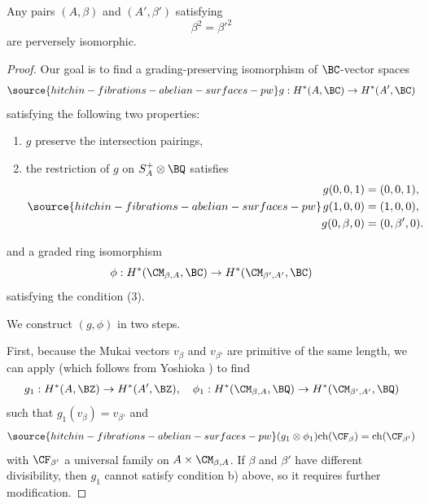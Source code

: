 \begin{thm}
\notready\label{thm2.6}
Any pairs $(A, \beta)$ and $(A', \beta')$ satisfying
\[
\beta^2 = \beta'^2
\]
are perversely isomorphic.
\end{thm}

\begin{proof}

Our goal is to find a grading-preserving isomorphism of $\BC$-vector spaces
\begin{equation}\label{39}
\source{hitchin-fibrations-abelian-surfaces-pw}
g: H^*(A, \BC)  \to H^*(A', \BC)
\end{equation}
satisfying the following two properties:
\begin{enumerate}
    \item[(a)] $g$ preserve the intersection pairings,
    \item[(b)] the restriction of $g$ on $S_A^+\otimes \BQ$ satisfies
    \begin{equation}\label{40}
\source{hitchin-fibrations-abelian-surfaces-pw}
    \begin{split}
        g(0,0,1) & = (0,0,1),\\
        g(1,0,0) & = (1,0,0),\\
        g(0,\beta,0) & = (0, \beta',0).
    \end{split}
    \end{equation}
\end{enumerate}
and a graded ring isomorphism
 \[
 \phi : H^*(\CM_{\beta,A}, \BC) \to H^*(\CM_{\beta', A'}, \BC)
 \]
satisfying the condition (3).

We construct $(g, \phi)$ in two steps.

First, because the Mukai vectors $v_\beta$ and $v_{\beta'}$ are primitive of the same length,
we can apply \cite[Theorem 8.3]{Markman3} (which follows from Yoshioka \cite{Yo}) to find
\[ g_1: H^*(A, \BZ)  \to H^*(A', \BZ) ,\quad \phi_1: H^*(\CM_{\beta,A}, \BQ) \to H^*(\CM_{\beta', A'}, \BQ)\]
such that $g_1(v_\beta) = v_{\beta'}$ and
\begin{equation}\label{eq41}
\source{hitchin-fibrations-abelian-surfaces-pw}
(g_1 \otimes \phi_1) \mathrm{ch}(\CF_\beta) = \mathrm{ch}(\CF_{\beta'})
\end{equation}
with $\CF_{\beta'}$ a universal family on $A \times \CM_{\beta,A}$.
If $\beta$ and $\beta'$ have different divisibility, then $g_1$ cannot satisfy condition b) above, so it requires further modification.


\end{proof}
